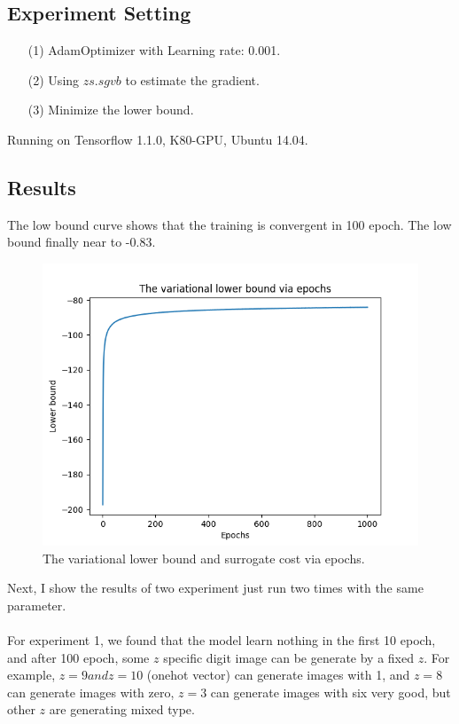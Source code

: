 \documentclass[a4paper]{article}
\begin{document}
\subsection{Experiment Setting}

\begin{enumerate}
\item[(1)] AdamOptimizer with Learning rate: 0.001.
\item[(2)] Using $zs.sgvb$ to estimate the gradient.
\item[(3)] Minimize the lower bound.

\end{enumerate}
Running on Tensorflow 1.1.0, K80-GPU, Ubuntu 14.04.

\subsection{Results}
The low bound curve shows that the training is convergent in 100 epoch. The low bound finally near to -0.83.

\begin{figure}[!htbp]
\begin{center}
\includegraphics[width=12cm]{gmmvae2/lb.png}
\end{center}
\caption{The variational lower bound and surrogate cost via epochs.}\label{datavis}
\end{figure}

Next, I show the results of two experiment just run two times with the same parameter.
\\
\\
For experiment 1, we found that the model learn nothing in the first 10 epoch, and after 100 epoch, some $z$ specific digit image can be generate by a fixed $z$. For example, $z=9 and z=10$ (onehot vector) can generate images with 1, and $z = 8$ can generate images with zero, $z=3$ can generate images with six very good, but other $z$ are generating mixed type.
\end{document}
